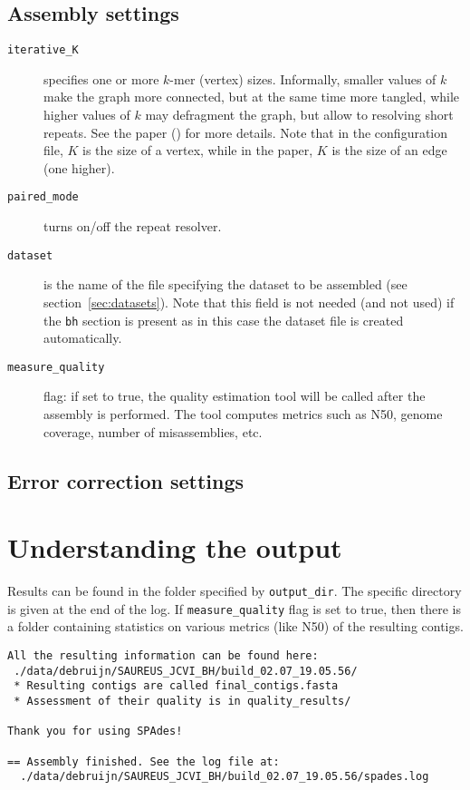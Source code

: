 \documentclass{article}
\begin{document}
\subsection{Assembly settings}
\begin{description}
\item[{\tt iterative\_K}] specifies one or more $k$-mer (vertex) sizes.  Informally, smaller values of $k$ make the graph more connected, but at the same time more tangled, while higher values of $k$ may defragment the graph, but allow to resolving short repeats. See the paper (\cite{main}) for more details.  Note that in the configuration file, $K$ 
is the size of a vertex, while in the paper, $K$ is the size of an edge (one higher).

\item[{\tt paired\_mode}] turns on/off the repeat resolver.

\item[{\tt dataset}] is the name of the file specifying the dataset to be assembled
(see section~\ref{sec:datasets}). Note that this field is not needed (and not used)
if the {\tt bh} section is present as in this case the dataset file is created automatically.

\item[{\tt measure\_quality}] flag: if set to true, the quality estimation tool will be called after the assembly is performed.  The tool computes metrics such as N50, genome coverage, number of misassemblies, etc.
\end{description}

\subsection{Error correction settings}


\section{Understanding the output}
Results can be found in the folder specified by {\tt output\_dir}.
The specific directory is given at the end of the log.
If {\tt measure\_quality} flag is set to true, then 
there is a folder containing statistics on various metrics (like N50) of the resulting contigs.
\begin{lstlisting}
All the resulting information can be found here: 
 ./data/debruijn/SAUREUS_JCVI_BH/build_02.07_19.05.56/
 * Resulting contigs are called final_contigs.fasta
 * Assessment of their quality is in quality_results/

Thank you for using SPAdes!

== Assembly finished. See the log file at: 
  ./data/debruijn/SAUREUS_JCVI_BH/build_02.07_19.05.56/spades.log
\end{lstlisting}
\end{document}

